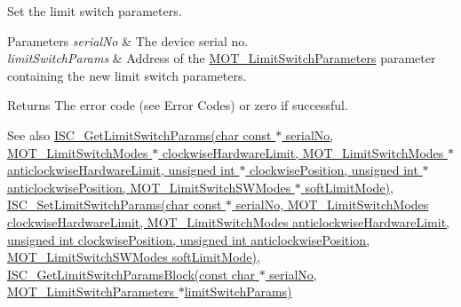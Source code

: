 Set the limit switch parameters. 


\begin{DoxyParams}{Parameters}
{\em serial\+No} & The device serial no. \\
\hline
{\em limit\+Switch\+Params} & Address of the \hyperlink{struct_m_o_t___limit_switch_parameters}{M\+O\+T\+\_\+\+Limit\+Switch\+Parameters} parameter containing the new limit switch parameters. \\
\hline
\end{DoxyParams}
\begin{DoxyReturn}{Returns}
The error code (see Error Codes) or zero if successful. 
\end{DoxyReturn}
\begin{DoxySeeAlso}{See also}
\hyperlink{group___integrated_stepper_motors_gaf1af0989fb0898aa5873cb22e03459db}{I\+S\+C\+\_\+\+Get\+Limit\+Switch\+Params(char const $\ast$ serial\+No, M\+O\+T\+\_\+\+Limit\+Switch\+Modes $\ast$ clockwise\+Hardware\+Limit, M\+O\+T\+\_\+\+Limit\+Switch\+Modes $\ast$ anticlockwise\+Hardware\+Limit, unsigned int $\ast$ clockwise\+Position, unsigned int $\ast$ anticlockwise\+Position, M\+O\+T\+\_\+\+Limit\+Switch\+S\+W\+Modes $\ast$ soft\+Limit\+Mode)}, \hyperlink{group___integrated_stepper_motors_ga9578a8190c3f062147b1377de6ed104b}{I\+S\+C\+\_\+\+Set\+Limit\+Switch\+Params(char const $\ast$ serial\+No, M\+O\+T\+\_\+\+Limit\+Switch\+Modes clockwise\+Hardware\+Limit, M\+O\+T\+\_\+\+Limit\+Switch\+Modes anticlockwise\+Hardware\+Limit, unsigned int clockwise\+Position, unsigned int anticlockwise\+Position, M\+O\+T\+\_\+\+Limit\+Switch\+S\+W\+Modes soft\+Limit\+Mode)}, \hyperlink{group___integrated_stepper_motors_ga272da5a80c888cd176f5329c54ccbcc6}{I\+S\+C\+\_\+\+Get\+Limit\+Switch\+Params\+Block(const char $\ast$ serial\+No, M\+O\+T\+\_\+\+Limit\+Switch\+Parameters $\ast$limit\+Switch\+Params)}


\end{DoxySeeAlso}
